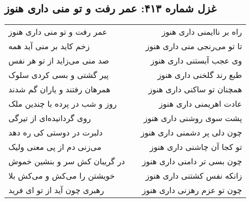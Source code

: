\begin{center}
\section*{غزل شماره ۴۱۳: عمر رفت و تو منی داری هنوز}
\label{sec:413}
\begin{longtable}{l p{0.5cm} r}
عمر رفت و تو منی داری هنوز
&&
راه بر ناایمنی داری هنوز
\\
زخم کاید بر منی آید همه
&&
تا تو می‌رنجی منی داری هنوز
\\
صد منی می‌زاید از تو هر نفس
&&
وی عجب آبستنی داری هنوز
\\
پیر گشتی و بسی کردی سلوک
&&
طبع رند گلخنی داری هنوز
\\
همرهان رفتند و یاران گم شدند
&&
همچنان تو ساکنی داری هنوز
\\
روز و شب در پرده با چندین ملک
&&
عادت اهریمنی داری هنوز
\\
روی گردانیده‌ای از تیرگی
&&
پشت سوی روشنی داری هنوز
\\
دلبرت در دوستی کی ره دهد
&&
چون دلی پر دشمنی داری هنوز
\\
می‌زنی دم از پی معنی ولیک
&&
تو کجا آن چاشنی داری هنوز
\\
در گریبان کش سر و بنشین خموش
&&
چون بسی تر دامنی داری هنوز
\\
خویشتن را می‌کش و می‌کش بلا
&&
زانکه نفس کشتنی داری هنوز
\\
رهبری چون آید از تو ای فرید
&&
چون تو عزم رهزنی داری هنوز
\\
\end{longtable}
\end{center}
